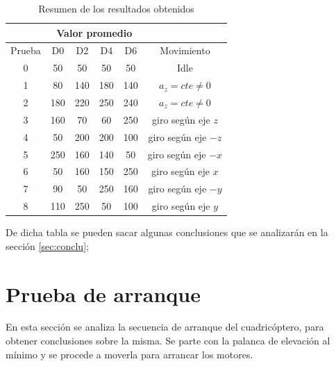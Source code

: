 \documentclass[main]{subfiles}
\begin{document}
\begin{table}[H]
\begin{center}
\begin{tabular}{c|c|c|c|c|c|} 
\cline{2-5}
& \multicolumn{4}{c|}{\cellcolor[gray]{0.8} Valor promedio} \\ \hline
\multicolumn{1}{|c|}{\cellcolor[gray]{0.8} Prueba} & \cellcolor[gray]{0.8} D0 & \cellcolor[gray]{0.8} D2 & \cellcolor[gray]{0.8} D4 & \cellcolor[gray]{0.8} D6 & \cellcolor[gray]{0.8} Movimiento \\ \hline
\multicolumn{1}{|c|}{\cellcolor[gray]{0.8}0} & 50 & 50 & 50 & 50 & Idle \\ \hline
\multicolumn{1}{|c|}{\cellcolor[gray]{0.8}1} & 80 & 140 & 180 & 140 & $a_z=cte\neq 0$\\ \hline
\multicolumn{1}{|c|}{\cellcolor[gray]{0.8}2} & 180 & 220 & 250 & 240 & $a_z=cte\neq 0$ \\ \hline \hline
\multicolumn{1}{|c|}{\cellcolor[gray]{0.8}3} & 160 & 70 & 60 & 250 & giro seg\'un eje $z$ \\ \hline
\multicolumn{1}{|c|}{\cellcolor[gray]{0.8}4} & 50 & 200 & 200 & 100 & giro seg\'un eje $-z$\\ \hline \hline
\multicolumn{1}{|c|}{\cellcolor[gray]{0.8}5} & 250 & 160 & 140 & 50 & giro seg\'un eje $-x$\\ \hline
\multicolumn{1}{|c|}{\cellcolor[gray]{0.8}6} & 50 & 160 & 150 & 250 & giro seg\'un eje $x$ \\ \hline
\multicolumn{1}{|c|}{\cellcolor[gray]{0.8}7} & 90 & 50 & 250 & 160 & giro seg\'un eje $-y$\\ \hline
\multicolumn{1}{|c|}{\cellcolor[gray]{0.8}8} & 110 & 250 & 50 &  100 & giro seg\'un eje $y$\\ \hline
\end{tabular} 
\caption{Resumen de los resultados obtenidos}
\label{tab:resumen_snif}
\end{center}
\end{table}

De dicha tabla se pueden sacar algunas conclusiones que se analizar\'an en la secci\'on \ref{sec:conclu};

\section{Prueba de arranque}
\label{sec:arranque}

En esta secci\'on se analiza la secuencia de arranque del cuadric\'optero, para obtener conclusiones sobre la misma. Se parte con la palanca de elevaci\'on al m\'inimo y se procede a moverla para arrancar los motores.\\
\end{document}
